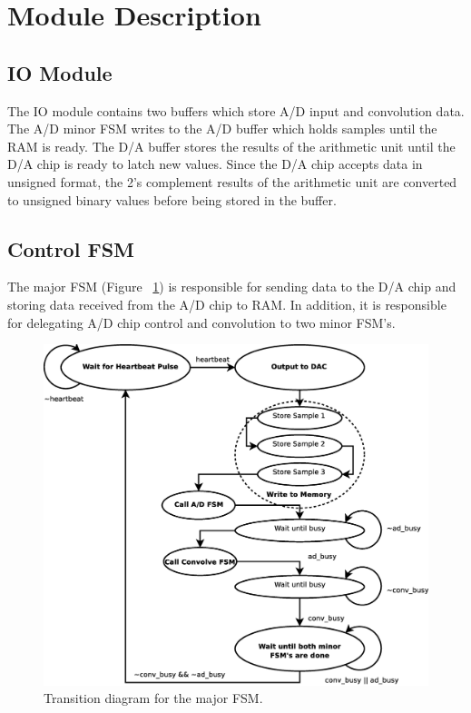 \documentclass[12pt]{article}
\begin{document}
\section{Module Description}
	\subsection{IO Module}
	The IO module contains two buffers which store A/D input and convolution
	data.  The A/D minor FSM writes to the A/D buffer which holds samples until
	the RAM is ready.  The D/A buffer stores the results of the arithmetic unit
	until the D/A chip is ready to latch new values.  Since the D/A chip accepts
	data in unsigned format, the 2's complement results of the arithmetic unit
	are converted to unsigned binary values before being stored in the buffer.

	\subsection{Control FSM}
	The major FSM (Figure ~\ref{fig:majorfsm}) is responsible for sending data
	to the D/A chip and storing data received from the A/D chip to RAM.  In
	addition, it is responsible for delegating A/D chip control and convolution
	to two minor FSM's.

	\begin{figure}[ht]
	\centering
	\includegraphics[scale=0.40]{majorfsm.eps}
	\caption{Transition diagram for the major FSM.}
	\label{fig:majorfsm}
	\end{figure}
\end{document}
